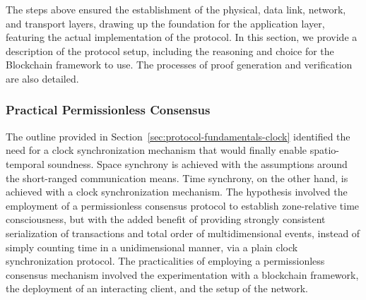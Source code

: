 The steps above ensured the establishment of the physical, data link, network, and transport layers, drawing up the foundation for the application layer, featuring the actual implementation of the \pol{} protocol. In this section, we provide a description of the protocol setup, including the reasoning and choice for the Blockchain framework to use. The processes of proof generation and verification are also detailed.

\subsubsection{Practical Permissionless Consensus} \label{sec:pol-implementation:practical-permissionless-consensus}

The outline provided in Section~\ref{sec:protocol-fundamentals-clock} identified the need for a clock synchronization mechanism that would finally enable spatio-temporal soundness. Space synchrony is achieved with the assumptions around the short-ranged communication means. Time synchrony, on the other hand, is achieved with a clock synchronization mechanism. The hypothesis involved the employment of a permissionless consensus protocol to establish zone-relative time consciousness, but with the added benefit of providing strongly consistent serialization of transactions and total order of multidimensional events, instead of simply counting time in a unidimensional manner, via a plain clock synchronization protocol. The practicalities of employing a permissionless consensus mechanism involved the experimentation with a blockchain framework, the deployment of an interacting client, and the setup of the network.

